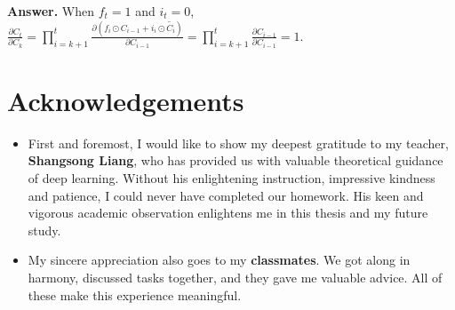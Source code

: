 \documentclass[12pt]{article}
\begin{document}
\textcolor{ans}{\textbf{Answer.} When $f_t=1$ and $i_t=0$, $\frac{\partial C_t}{\partial C_k}=\prod_{i=k+1}^{t}\frac{\partial (f_i\odot C_{i-1}+i_i \odot \tilde{C_i})}{\partial C_{i-1}}=\prod_{i=k+1}^{t}\frac{\partial C_{i-1}}{\partial C_{i-1}}=1$.}

\clearpage
\section{\begingroup \large Acknowledgements \endgroup}

\noindent \begin{itemize} \item{First and foremost, I would like to show my deepest gratitude to my teacher, \textbf{Shangsong Liang}, who has provided us with valuable theoretical guidance of deep learning. Without his enlightening instruction, impressive kindness and patience, I could never have completed our homework. His keen and vigorous academic observation enlightens me in this thesis and my future study.}
\item{My sincere appreciation also goes to my \textbf{classmates}. We got along in harmony, discussed tasks together, and they gave me valuable advice. All of these make this experience meaningful.}
\end{itemize}
\end{document}
